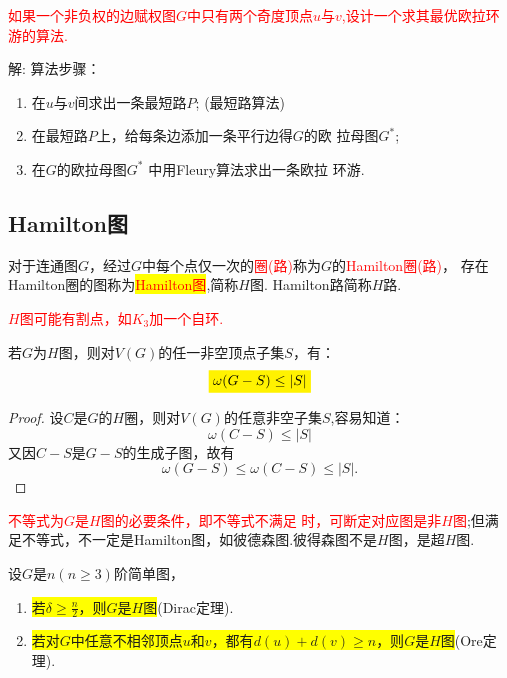 \begin{example}
\textcolor{red}{如果一个非负权的边赋权图$G$中只有两个奇度顶点$u$与$v$,设计一个求其最优欧拉环游的算法.}

\noindent 解:
\noindent 算法步骤：
\begin{enumerate}
	\item 在$u$与$v$间求出一条最短路$P$; (最短路算法)
	\item 在最短路$P$上，给每条边添加一条平行边得$G$的欧
	拉母图$G^{*}$;
	\item 在$G$的欧拉母图$G^{*}$ 中用Fleury算法求出一条欧拉
	环游.
\end{enumerate}
\end{example}


\subsection{Hamilton图}
\begin{definition}
	对于连通图$G$，经过$G$中每个点仅一次的\textcolor{red}{圈(路)}称为$G$的\textcolor{red}{Hamilton圈(路)}，
	存在Hamilton圈的图称为\colorbox{yellow}{\textcolor{red}{Hamilton图}},简称$H$图. Hamilton路简称$H$路.
\end{definition}
\begin{note}
	\textcolor{red}{$H$图可能有割点，如$K_3$加一个自环.}
\end{note}

\begin{theorem}[必要条件]
	\label{jjjjjhhhh}
	若$G$为$H$图，则对$V(G)$的任一非空顶点子集$S$，有：
	\[
	\colorbox{yellow}{$\omega(G-S)\leq |S|$}
	\]
\end{theorem}
\begin{proof}
	设$C$是$G$的$H$圈，则对$V(G)$的任意非空子集$S$,容易知道：
	\[
	\omega(C-S)\leq |S|
	\]
	又因$C-S$是$G-S$的生成子图，故有
	\[
	\omega(G-S)\leq \omega(C-S)\leq |S|.
	\]
\end{proof}
\begin{note}
	\textcolor{red}{不等式为$G$是$H$图的必要条件，即不等式不满足
		时，可断定对应图是非$H$图};但满足不等式，不一定是Hamilton图，如彼德森图.彼得森图不是$H$图，是超$H$图.
\end{note}

\begin{theorem}[充分条件]
	设$G$是$n(n\geq 3)$阶简单图，
	\begin{enumerate}
		\item \colorbox{yellow}{若$\delta\geq \frac{n}{2}$，则$G$是$H$图}(Dirac定理).
		\item  \colorbox{yellow}{若对$G$中任意不相邻顶点$u$和$v$，都有$d(u)+d(v)\geq n$，则$G$是$H$图}(Ore定理).
	\end{enumerate}
\end{theorem}

